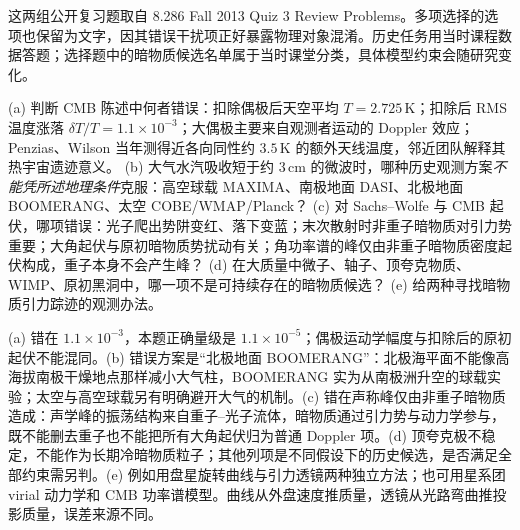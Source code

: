 这两组公开复习题取自 8.286 Fall 2013 Quiz 3 Review Problems。多项选择的选项也保留为文字，因其错误干扰项正好暴露物理对象混淆。历史任务用当时课程数据答题；选择题中的暗物质候选名单属于当时课堂分类，具体模型约束会随研究变化。

\begin{exercise}
(a) 判断 CMB 陈述中何者错误：扣除偶极后天空平均 $T=2.725\,\mathrm K$；扣除后 RMS 温度涨落 $\delta T/T=1.1\times10^{-3}$；大偶极主要来自观测者运动的 Doppler 效应；Penzias、Wilson 当年测得近各向同性约 $3.5\,\mathrm K$ 的额外天线温度，邻近团队解释其热宇宙遗迹意义。
(b) 大气水汽吸收短于约 $3\,\mathrm{cm}$ 的微波时，哪种历史观测方案\emph{不能凭所述地理条件}克服：高空球载 MAXIMA、南极地面 DASI、北极地面 BOOMERANG、太空 COBE/WMAP/Planck？
(c) 对 Sachs--Wolfe 与 CMB 起伏，哪项错误：光子爬出势阱变红、落下变蓝；末次散射时非重子暗物质对引力势重要；大角起伏与原初暗物质势扰动有关；角功率谱的峰仅由非重子暗物质密度起伏构成，重子本身不会产生峰？
(d) 在大质量中微子、轴子、顶夸克物质、WIMP、原初黑洞中，哪一项不是可持续存在的暗物质候选？
(e) 给两种寻找暗物质引力踪迹的观测办法。
\end{exercise}
\begin{solution}
(a) 错在 $1.1\times10^{-3}$，本题正确量级是 $1.1\times10^{-5}$；偶极运动学幅度与扣除后的原初起伏不能混同。(b) 错误方案是“北极地面 BOOMERANG”：北极海平面不能像高海拔南极干燥地点那样减小大气柱，BOOMERANG 实为从南极洲升空的球载实验；太空与高空球载另有明确避开大气的机制。(c) 错在声称峰仅由非重子暗物质造成：声学峰的振荡结构来自重子--光子流体，暗物质通过引力势与动力学参与，既不能删去重子也不能把所有大角起伏归为普通 Doppler 项。(d) 顶夸克极不稳定，不能作为长期冷暗物质粒子；其他列项是不同假设下的历史候选，是否满足全部约束需另判。(e) 例如用盘星旋转曲线与引力透镜两种独立方法；也可用星系团 virial 动力学和 CMB 功率谱模型。曲线从外盘速度推质量，透镜从光路弯曲推投影质量，误差来源不同。
\end{solution}

